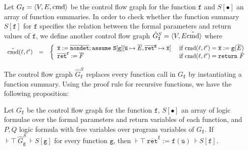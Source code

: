 
Let $G_{\mathtt{f}} = \langle V, E, \textmd{cmd} \rangle$ be the
control flow graph for the function $\mathtt{f}$ and $S[\bullet]$ an
array of function summaries. In order to check whether the function
summary $S[{\mathtt{f}}]$ for $\mathtt{f}$ specifies the relation 
between the formal parameters and return values of $\mathtt{f}$, 
we define another control flow graph
$\hat{G}_{\mathtt{f}}^S = \langle V, E \hat{\textmd{cmd}}
\rangle$ where
\begin{equation*}
  \begin{array}{rcl}
    \hat{\textmd{cmd}} (\ell, \ell') & = &
    \left\{
      \begin{array}{ll}
        \overline{\mathtt{x}} := 
        \overline{\mathtt{nondet}};
        \mathtt{assume\ S[{\mathtt{g}}]}[
        \overline{\mathtt{u}} \mapsto \overline{E},
        \mathtt{\overline{ret}^g} \mapsto \overline{\mathtt{x}}]    
        &
        \textmd{ if } \textmd{cmd} (\ell, \ell') = 
        \overline{\mathtt{x}} := \mathtt{g} (\overline{E})\\
        \mathtt{\overline{ret}^f} := \overline{F}
        &
        \textmd{ if } \textmd{cmd} (\ell, \ell') = \mathtt{return\ }
        \hat{F}
      \end{array}
    \right.
  \end{array}
\end{equation*}

The control flow graph $\hat{G}_{\mathtt{f}}^S$ replaces every
function call in $G_{\mathtt{f}}$ by instantiating a function
summary. Using the proof rule for recursive functions, we have the
following proposition:
\begin{proposition}
  Let $G_{\mathtt{f}}$ be the control flow graph for the function
  $\mathtt{f}$, $S[\bullet]$ an array of logic formulae over the formal
  parameters and return variables of each function, and 
  $P, Q$ logic formula with free variables over program variables of
  $G_{\mathtt{f}}$. If $\assert{\top}\
  \hat{G}_{\mathtt{g}}^S\ \assert{S[\mathtt{g}]}$ for every
  function $\mathtt{g}$, then $\assert{\top}\ \mathtt{\overline{ret}^f} :=
  \mathtt{f} (\overline{\mathtt{u}})\ \assert{S[\mathtt{f}]}$.
\end{proposition}

